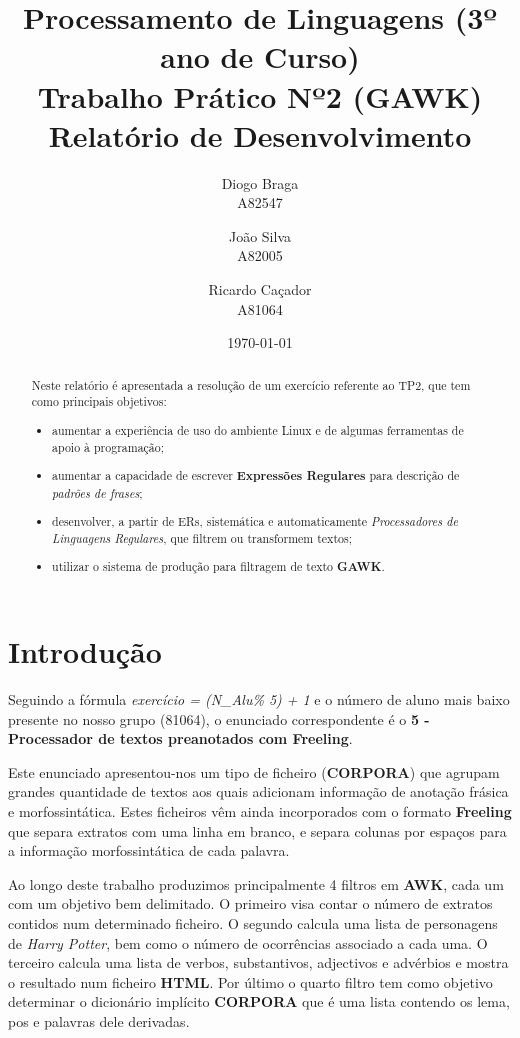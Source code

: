 \documentclass[11pt,a4paper]{report}
\title{Processamento de Linguagens (3º ano de Curso)\\
	\textbf{Trabalho Prático Nº2 (GAWK)}\\ Relatório de Desenvolvimento}
\author{Diogo Braga\\ A82547 \and João Silva\\ A82005 \and Ricardo Caçador\\ A81064}
\date{\today}
\begin{document}
\maketitle

\begin{abstract}
	Neste relatório é apresentada a resolução de um exercício referente ao TP2, que tem como principais objetivos:
	\begin{itemize}
		\item aumentar a experiência de uso do ambiente Linux e de algumas ferramentas de apoio à programação;
 		\item aumentar a capacidade de escrever \textbf{Expressões Regulares} para descrição de \textit{padrões de frases};
 		\item desenvolver, a partir de ERs, sistemática e automaticamente \textit{Processadores de Linguagens Regulares}, que filtrem ou transformem textos;
 		\item utilizar o sistema de produção para filtragem de texto \textbf{GAWK}.
	\end{itemize}
\end{abstract}

\tableofcontents

\newpage

\chapter{Introdução}
\label{chap:intro}

Seguindo a fórmula \emph{exercício = (N\_Alu\% 5)  +  1} e o número de aluno mais baixo presente no nosso grupo (81064), o enunciado correspondente é o \textbf{5 - Processador de textos preanotados com Freeling}.

Este enunciado apresentou-nos um tipo de ficheiro (\textbf{CORPORA}) que agrupam grandes quantidade de textos aos quais adicionam informação de anotação frásica e morfossintática. Estes ficheiros vêm ainda incorporados com o formato \textbf{Freeling} que separa extratos com uma linha em branco, e separa colunas por espaços para a informação morfossintática de cada palavra.

Ao longo deste trabalho produzimos principalmente 4 filtros em \textbf{AWK}, cada um com um objetivo bem delimitado. O primeiro visa contar o número de extratos contidos num determinado ficheiro. O segundo calcula uma lista de personagens de \textit{Harry Potter}, bem como o número de ocorrências associado a cada uma. O terceiro calcula uma lista de verbos,  substantivos, adjectivos e advérbios e mostra o resultado num ficheiro \textbf{HTML}. Por último o quarto filtro tem como objetivo determinar o dicionário implícito \textbf{CORPORA} que é uma lista contendo os lema, pos e palavras dele derivadas.
\end{document}
